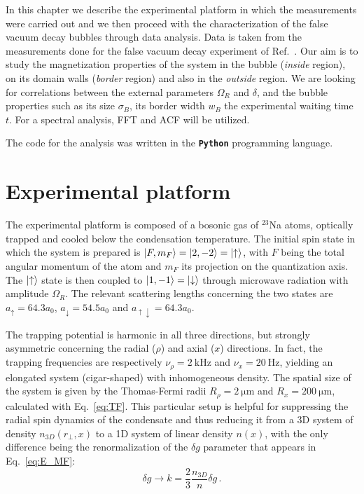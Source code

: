 In this chapter we describe the experimental platform in which the measurements were carried out and we then proceed with the characterization of the false vacuum decay bubbles through data analysis. Data is taken from the measurements done for the false vacuum decay experiment of Ref.\ \cite{zenesini2024false}. Our aim is to study the magnetization properties of the system in the bubble (\textit{inside} region), on its domain walls (\textit{border} region) and also in the \textit{outside} region. We are looking for correlations between the external parameters $\Omega_R$ and $\delta$, and the bubble properties such as its size $\sigma_B$, its border width $w_B$ the experimental waiting time $t$. For a spectral analysis, FFT and ACF will be utilized. 

The code for the analysis was written in the \textbf{\texttt{Python}} programming language.

\section{Experimental platform}
The experimental platform is composed of a bosonic gas of $^{23}$Na atoms, optically trapped and cooled below the condensation temperature. The initial spin state in which the system is prepared is $\ket{F, m_F} = \ket{2, -2} = \ket{\uparrow}$, with $F$ being the total angular momentum of the atom 
and $m_F$ its projection on the quantization axis. The $\ket{\uparrow}$ state is then coupled to $\ket{1, -1} = \ket{\downarrow}$ through microwave radiation with amplitude $\Omega_R$. The relevant scattering lengths concerning the two states are $a_\uparrow = 64.3 a_0$, $a_\downarrow = 54.5 a_0$ and $a_{\uparrow\downarrow} = 64.3 a_0$.

The trapping potential is harmonic in all three directions, but strongly asymmetric concerning the radial ($\rho$) and axial ($x$) directions. In fact, the trapping frequencies are respectively $\nu_\rho = 2\ \unit{\kilo\hertz}$ and $\nu_x = 20\ \unit{\hertz}$, yielding an elongated system (cigar-shaped) with inhomogeneous density. The spatial size of the system is given by the Thomas-Fermi radii $R_\rho = 2\ \unit{\micro\meter}$ and $R_x = 200\ \unit{\micro\meter}$, calculated with Eq.\ \eqref{eq:TF}. This particular setup is helpful for suppressing the radial spin dynamics of the condensate and thus reducing it from a 3D system of density $n_{3D}(r_\perp,x)$ to a 1D system of linear density $n(x)$, with the only difference being the renormalization of the $\delta g$ parameter that appears in Eq.\ \eqref{eq:E_MF}:
\[
    \delta g \to k = \frac{2}{3}\frac{n_{3D}}{n}\delta g\, .
\]


